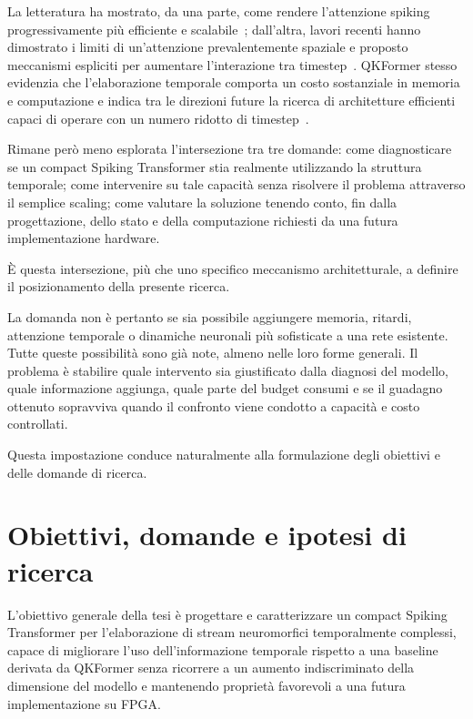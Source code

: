 La letteratura ha mostrato, da una parte, come rendere l'attenzione spiking progressivamente più efficiente e scalabile~\cite{zhou2023spikformer, yao2023spikedriven, zhou2024qkformer}; dall'altra, lavori recenti hanno dimostrato i limiti di un'attenzione prevalentemente spaziale e proposto meccanismi espliciti per aumentare l'interazione tra timestep~\cite{lee2025spiking, shi2026multidelay}. QKFormer stesso evidenzia che l'elaborazione temporale comporta un costo sostanziale in memoria e computazione e indica tra le direzioni future la ricerca di architetture efficienti capaci di operare con un numero ridotto di timestep~\cite{zhou2024qkformer}.

Rimane però meno esplorata l'intersezione tra tre domande: come diagnosticare se un compact Spiking Transformer stia realmente utilizzando la struttura temporale; come intervenire su tale capacità senza risolvere il problema attraverso il semplice scaling; come valutare la soluzione tenendo conto, fin dalla progettazione, dello stato e della computazione richiesti da una futura implementazione hardware.

È questa intersezione, più che uno specifico meccanismo architetturale, a definire il posizionamento della presente ricerca.

La domanda non è pertanto se sia possibile aggiungere memoria, ritardi, attenzione temporale o dinamiche neuronali più sofisticate a una rete esistente. Tutte queste possibilità sono già note, almeno nelle loro forme generali. Il problema è stabilire quale intervento sia giustificato dalla diagnosi del modello, quale informazione aggiunga, quale parte del budget consumi e se il guadagno ottenuto sopravviva quando il confronto viene condotto a capacità e costo controllati.

Questa impostazione conduce naturalmente alla formulazione degli obiettivi e delle domande di ricerca.




\section{Obiettivi, domande e ipotesi di ricerca}
\label{sec:obiettivi_domande_ipotesi}

L'obiettivo generale della tesi è progettare e caratterizzare un compact Spiking Transformer per l'elaborazione di stream neuromorfici temporalmente complessi, capace di migliorare l'uso dell'informazione temporale rispetto a una baseline derivata da QKFormer senza ricorrere a un aumento indiscriminato della dimensione del modello e mantenendo proprietà favorevoli a una futura implementazione su FPGA.

